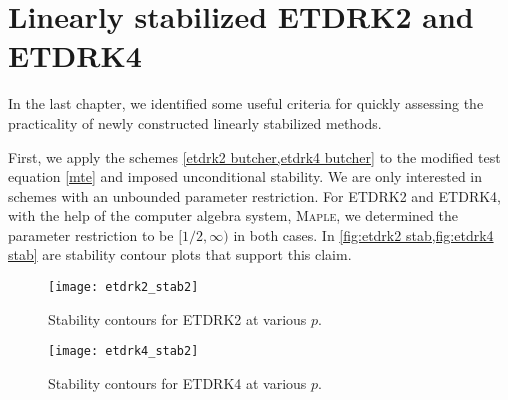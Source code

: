 \section{Linearly stabilized ETDRK2 and ETDRK4}
In the last chapter, we identified some useful criteria for quickly assessing the practicality of newly constructed linearly stabilized methods. 

First, we apply the schemes \cref{etdrk2 butcher,etdrk4 butcher} to the modified test equation \cref{mte} and imposed unconditional stability. We are only interested in schemes with an unbounded parameter restriction. For ETDRK2 and ETDRK4, with the help of the computer algebra system, \textsc{Maple}\textsuperscript{\texttrademark}, we determined the parameter restriction to be $[1/2, \infty)$ in both cases. In \cref{fig:etdrk2 stab,fig:etdrk4 stab} are stability contour plots that support this claim.

\begin{figure}[htb!]
	\centering
\texttt{[image: etdrk2\_stab2]}
\caption{Stability contours for ETDRK2 at various $p$.}
\label{fig:etdrk2 stab}
\end{figure}

\begin{figure}[htb!]
	\centering
\texttt{[image: etdrk4\_stab2]}
\caption{Stability contours for ETDRK4 at various $p$.}
\label{fig:etdrk4 stab}
\end{figure}

